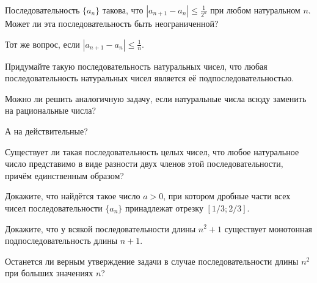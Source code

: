 \documentclass[a4paper, 12pt, num=25]{listok}
\begin{document}
\begin{problem}
\begin{probparts}
	\item Последовательность $\{a_n\}$ такова, что $|a_{n+1} - a_n| \le \frac1{2^n}$ при любом натуральном $n$.
	Может ли эта последовательность быть неограниченной?
	\item Тот же вопрос, если $|a_{n+1} - a_n| \le \frac1n$.
\end{probparts}
\end{problem}
\begin{problem}
\begin{probparts}
	\item Придумайте такую последовательность натуральных чисел, что любая последовательность натуральных чисел является её подпоследовательностью.
	\item Можно ли решить аналогичную задачу, если натуральные числа всюду заменить на рациональные числа?
	\item А на действительные?
\end{probparts}
\end{problem}
\begin{problem}
	Существует ли такая последовательность целых чисел, что любое натуральное число представимо в виде разности двух членов этой последовательности,
	причём единственным образом?
\end{problem}
\begin{problem}
	Докажите, что найдётся такое число $a > 0$,
	при котором дробные части всех чисел последовательности $\{a_n\}$ принадлежат отрезку $[1/3; 2/3]$.
\end{problem}
\begin{problem}
\begin{probparts}
	\item Докажите, что у всякой последовательности длины $n^2 + 1$ существует монотонная подпоследовательность длины $n + 1$.
	\item Останется ли верным утверждение задачи в случае последовательности длины $n^2$ при больших значениях $n$?
\end{probparts}
\end{problem}
\end{document}
